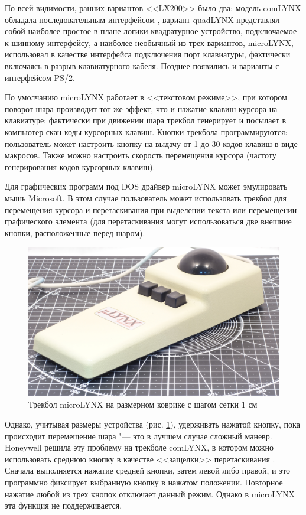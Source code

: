 \documentclass[11pt, a4paper]{article}
\begin{document}
По всей видимости, ранних вариантов <<LX200>> было два: модель comLYNX обладала последовательным интерфейсом \cite{comlynx}, вариант quadLYNX представлял собой наиболее простое в плане логики квадратурное устройство, подключаемое к шинному интерфейсу, а наиболее необычный из трех вариантов, microLYNX, использовал в качестве интерфейса подключения порт клавиатуры, фактически включаясь в разрыв клавиатурного кабеля. Позднее появились и варианты с интерфейсом PS/2.

По умолчанию microLYNX работает в <<текстовом режиме>>, при котором поворот шара производит тот же эффект, что и нажатие клавиш курсора на клавиатуре: фактически при движении шара трекбол генерирует и посылает в компьютер скан-коды курсорных клавиш. Кнопки трекбола программируются: пользователь может настроить кнопку на выдачу от 1 до 30 кодов клавиш в виде макросов. Также можно настроить скорость перемещения курсора (частоту генерирования кодов курсорных клавиш). 

Для графических программ под DOS драйвер microLYNX может эмулировать мышь Microsoft. В этом случае пользователь может использовать трекбол для перемещения курсора и перетаскивания при выделении текста или перемещении графического элемента (для перетаскивания могут использоваться две внешние кнопки, расположенные перед шаром).

\begin{figure}[h]
    \centering
    \includegraphics[scale=0.4]{1986_honeywell_microlynx_trackball/size.jpg}
    \caption{Трекбол microLYNX на размерном коврике с шагом сетки 1 см}
    \label{fig:microLYNXSize}
\end{figure}

Однако, учитывая размеры устройства (рис. \ref{fig:microLYNXSize}), удерживать нажатой кнопку, пока происходит
перемещение шара "--- это в лучшем случае сложный маневр. Honeywell решила эту проблему на трекболе comLYNX, в котором можно использовать среднюю кнопку в качестве <<защелки>> перетаскивания \cite{comlynx}. Сначала выполняется нажатие средней кнопки, затем левой либо правой, и это программно фиксирует выбранную кнопку в нажатом положении. Повторное нажатие любой из трех кнопок отключает данный режим. Однако в microLYNX эта функция не поддерживается.
\end{document}
